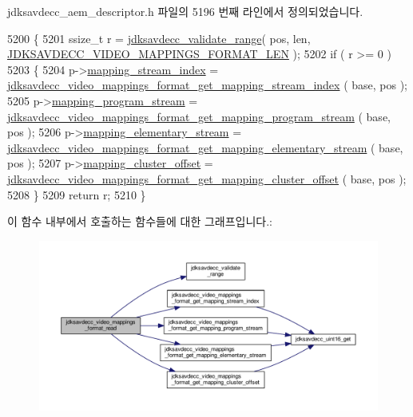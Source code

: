 jdksavdecc\+\_\+aem\+\_\+descriptor.\+h 파일의 5196 번째 라인에서 정의되었습니다.


\begin{DoxyCode}
5200 \{
5201     ssize\_t r = \hyperlink{group__util_ga9c02bdfe76c69163647c3196db7a73a1}{jdksavdecc\_validate\_range}( pos, len, 
      \hyperlink{group__video__mappings__format_gabb8ba2fa0ffcfce879a8694568f54ded}{JDKSAVDECC\_VIDEO\_MAPPINGS\_FORMAT\_LEN} );
5202     \textcolor{keywordflow}{if} ( r >= 0 )
5203     \{
5204         p->\hyperlink{structjdksavdecc__video__mappings__format_ae776f05f1f60f83a69c154844271ca4a}{mapping\_stream\_index} = 
      \hyperlink{group__video__mappings__format_ga9a44187a52b442634b3895522650ad52}{jdksavdecc\_video\_mappings\_format\_get\_mapping\_stream\_index}
      ( base, pos );
5205         p->\hyperlink{structjdksavdecc__video__mappings__format_a71a5421044e2dd9e8a1bc1667b0acf84}{mapping\_program\_stream} = 
      \hyperlink{group__video__mappings__format_ga836a0fc1bc8548c9818ff9761a9fb4a7}{jdksavdecc\_video\_mappings\_format\_get\_mapping\_program\_stream}
      ( base, pos );
5206         p->\hyperlink{structjdksavdecc__video__mappings__format_a17b2b1b6c4e5fe6a591563df87fc2cd4}{mapping\_elementary\_stream} = 
      \hyperlink{group__video__mappings__format_ga95475c1d3ac88b5cb3e08c48b0f52f6b}{jdksavdecc\_video\_mappings\_format\_get\_mapping\_elementary\_stream}
      ( base, pos );
5207         p->\hyperlink{structjdksavdecc__video__mappings__format_ab57e85d38dacb8e4e841cf9f1fbd7a36}{mapping\_cluster\_offset} = 
      \hyperlink{group__video__mappings__format_ga8966b74539a03c52127060ffbb15febf}{jdksavdecc\_video\_mappings\_format\_get\_mapping\_cluster\_offset}
      ( base, pos );
5208     \}
5209     \textcolor{keywordflow}{return} r;
5210 \}
\end{DoxyCode}


이 함수 내부에서 호출하는 함수들에 대한 그래프입니다.\+:
\nopagebreak
\begin{figure}[H]
\begin{center}
\leavevmode
\includegraphics[width=350pt]{group__video__mappings__format_ga5e21f35c52e47c231b70218eec68a748_cgraph}
\end{center}
\end{figure}


